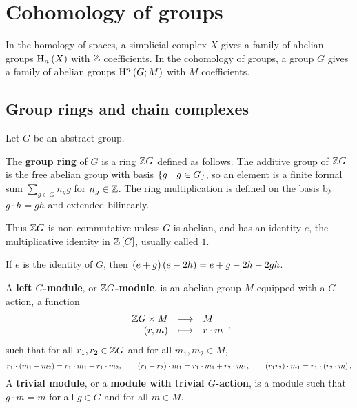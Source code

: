 \pagebreak

\section{Cohomology of groups}


In the homology of spaces, a simplicial complex $ X $ gives a family of abelian groups $ \H_n\br{X} $ with $ \mathbb{Z} $ coefficients. In the cohomology of groups, a group $ G $ gives a family of abelian groups $ \H^n\br{G; M} $ with $ M $ coefficients.

\subsection{Group rings and chain complexes}

Let $ G $ be an abstract group.

\begin{definition}
The \textbf{group ring} of $ G $ is a ring $ \mathbb{Z} G $ defined as follows. The additive group of $ \mathbb{Z} G $ is the free abelian group with basis $ \cbr{g \st g \in G} $, so an element is a finite formal sum $ \sum_{g \in G} n_gg $ for $ n_g \in \mathbb{Z} $. The ring multiplication is defined on the basis by $ g \cdot h = gh $ and extended bilinearly.
\end{definition}

Thus $ \mathbb{Z} G $ is non-commutative unless $ G $ is abelian, and has an identity $ e $, the multiplicative identity in $ \ZZ\sbr{G} $, usually called $ 1 $.

\begin{example}
If $ e $ is the identity of $ G $, then $ \br{e + g}\br{e - 2h} = e + g - 2h - 2gh $.
\end{example}

\begin{definition}
A \textbf{left $ G $-module}, or \textbf{$ \mathbb{Z} G $-module}, is an abelian group $ M $ equipped with a $ G $-action, a function
$$ \function{\ZZ G \times M}{M}{\br{r, m}}{r \cdot m}, $$
such that for all $ r_1, r_2 \in \mathbb{Z} G $ and for all $ m_1, m_2 \in M $,
$$ r_1 \cdot \br{m_1 + m_2} = r_1 \cdot m_1 + r_1 \cdot m_2, \qquad \br{r_1 + r_2} \cdot m_1 = r_1 \cdot m_1 + r_2 \cdot m_1, \qquad \br{r_1r_2} \cdot m_1 = r_1 \cdot \br{r_2 \cdot m}. $$
A \textbf{trivial module}, or a \textbf{module with trivial $ G $-action}, is a module such that $ g \cdot m = m $ for all $ g \in G $ and for all $ m \in M $.
\end{definition}

